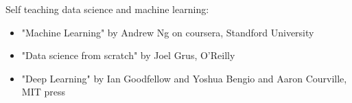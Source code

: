 \documentclass[10pt,a4paper,ragged2e]{altacv}
\begin{document}

\begin{fullwidth}
\makecvheader
\end{fullwidth}



Self teaching data science and machine learning:
\begin{itemize}
    \item "Machine Learning" by Andrew Ng on coursera, Standford University
    \item "Data science from scratch" by Joel Grus, O'Reilly
    \item "Deep Learning" by Ian Goodfellow and Yoshua Bengio and Aaron Courville, MIT press
\end{itemize}

\divider
\end{document}
